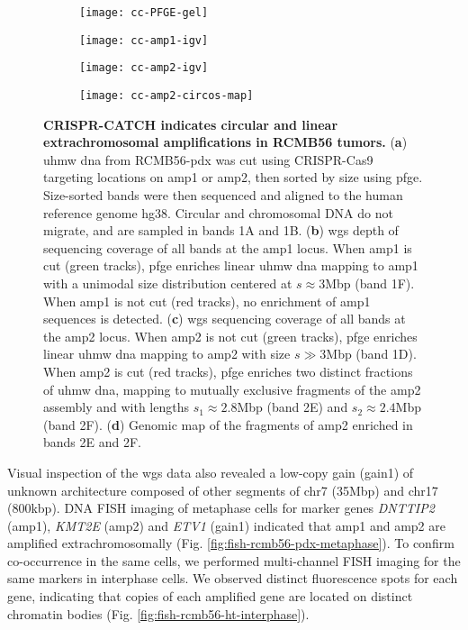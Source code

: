 \begin{figure}[p]
    \centering
    \begin{subfigure}{0.49\textwidth}
        \centering
        \texttt{[image: cc-PFGE-gel]}
        \caption{}
        \label{subfig:cc-pfge-gel}
    \end{subfigure}
    \begin{subfigure}{0.49\textwidth}
        \centering
        \texttt{[image: cc-amp1-igv]}
        \caption{}
        \label{subfig:cc-amp1-igv}
    \end{subfigure}
    \begin{subfigure}{0.44\textwidth}
        \centering
        \texttt{[image: cc-amp2-igv]}
        \caption{}
        \label{subfig:cc-amp2-igv}
    \end{subfigure}
    \begin{subfigure}{0.54\textwidth}
        \centering
        \texttt{[image: cc-amp2-circos-map]}
        \caption{}
        \label{subfig:cc-amp2-circos-map}
    \end{subfigure}
    \caption[CRISPR-CATCH indicates circular and linear extrachromosomal amplifications in RCMB56 tumors.]{\textbf{CRISPR-CATCH indicates circular and linear extrachromosomal amplifications in RCMB56 tumors.} (\textbf{a}) \gls{uhmw dna} from RCMB56-pdx was cut using CRISPR-Cas9 targeting locations on amp1 or amp2, then sorted by size using \gls{pfge}. Size-sorted bands were then sequenced and aligned to the human reference genome hg38. Circular and chromosomal DNA do not migrate, and are sampled in bands 1A and 1B. (\textbf{b}) \gls{wgs} depth of sequencing coverage of all bands at the amp1 locus. When amp1 is cut (green tracks), \gls{pfge} enriches linear \gls{uhmw dna} mapping to amp1 with a unimodal size distribution centered at $s \approx 3$Mbp (band 1F). When amp1 is not cut (red tracks), no enrichment of amp1 sequences is detected. (\textbf{c}) \gls{wgs} sequencing coverage of all bands at the amp2 locus. When amp2 is not cut (green tracks), \gls{pfge} enriches linear \gls{uhmw dna} mapping to amp2 with size $s \gg 3$Mbp (band 1D). When amp2 is cut (red tracks), \gls{pfge} enriches two distinct fractions of \gls{uhmw dna}, mapping to mutually exclusive fragments of the amp2  assembly and with lengths $s_1 \approx 2.8$Mbp (band 2E) and $s_2 \approx 2.4$Mbp (band 2F). (\textbf{d}) Genomic map of the fragments of amp2 enriched in bands 2E and 2F.}
    \label{fig:cc}
\end{figure}

Visual inspection of the \acrshort{wgs} data also revealed a low-copy gain (gain1) of unknown architecture composed of other segments of chr7 (35Mbp) and chr17 (800kbp). DNA \gls{FISH} imaging of metaphase cells for marker genes \textit{DNTTIP2} (amp1), \textit{KMT2E} (amp2) and \textit{ETV1} (gain1) indicated that amp1 and amp2 are amplified extrachromosomally (Fig. \ref{fig:fish-rcmb56-pdx-metaphase}). To confirm co-occurrence in the same cells, we performed multi-channel FISH imaging for the same markers in interphase cells. We observed distinct fluorescence spots for each gene, indicating that copies of each amplified gene are located on distinct chromatin bodies (Fig. \ref{fig:fish-rcmb56-ht-interphase}). 

